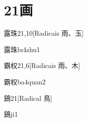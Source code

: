 
\section*{21画}

\begin{entry}{露珠}{21,10}[Radicais ⾬、⽟]
  \begin{phonetics}{露珠}{lu4zhu1}
  \end{phonetics}
\end{entry}

\begin{entry}{霸权}{21,6}[Radicais ⾬、⽊]
  \begin{phonetics}{霸权}{ba4quan2}
  \end{phonetics}
\end{entry}

\begin{entry}{鷄}{21}[Radical ⿃]
  \begin{phonetics}{鷄}{ji1}
  \end{phonetics}
\end{entry}


